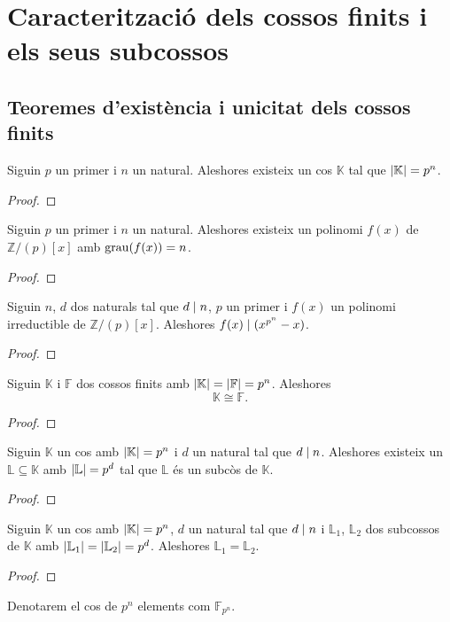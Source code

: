 \documentclass[../../Main.tex]{subfiles}
\begin{document}
\section{Caracterització dels cossos finits i els seus subcossos}
	\subsection{Teoremes d'existència i unicitat dels cossos finits}
	\begin{theorem}
		Siguin \(p\) un primer i \(n\) un natural. Aleshores existeix un cos \(\mathbb{K}\) tal que \(\abs{\mathbb{K}}=p^{n}\).
		\begin{proof}
		\end{proof}
	\end{theorem}
	\begin{corollary}
		Siguin \(p\) un primer i \(n\) un natural. Aleshores existeix un polinomi \(f(x)\) de \(\mathbb{Z}/(p)[x]\) amb \(\operatorname{grau}(f(x))=n\).
		\begin{proof}
		\end{proof}
	\end{corollary}
	\begin{lemma}
		Siguin \(n\), \(d\) dos naturals tal que \(d\mathrel{|} n\), \(p\) un primer i \(f(x)\) un polinomi irreductible de \(\mathbb{Z}/(p)[x]\). Aleshores \(f(x)\mathrel{|}(x^{p^{n}}-x)\).
		\begin{proof}
		\end{proof}
	\end{lemma}
	\begin{theorem}
		Siguin \(\mathbb{K}\) i \(\mathbb{F}\) dos cossos finits amb \(\abs{\mathbb{K}}=\abs{\mathbb{F}}=p^{n}\). Aleshores %
		\[\mathbb{K}\cong\mathbb{F}.\]
		\begin{proof}
		\end{proof}
	\end{theorem}
	\begin{theorem}
		Siguin \(\mathbb{K}\) un cos amb \(\abs{\mathbb{K}}=p^{n}\) i \(d\) un natural tal que \(d\mathrel{|} n\). Aleshores existeix un \(\mathbb{L}\subseteq\mathbb{K}\) amb \(\abs{\mathbb{L}}=p^{d}\) tal que \(\mathbb{L}\) és un subcòs de \(\mathbb{K}\).
		\begin{proof}
		\end{proof}
	\end{theorem}
	\begin{theorem}
		Siguin \(\mathbb{K}\) un cos amb \(\abs{\mathbb{K}}=p^{n}\), \(d\) un natural tal que \(d\mathrel{|} n\) i \(\mathbb{L}_{1}\), \(\mathbb{L}_{2}\) dos subcossos de \(\mathbb{K}\) amb \(\abs{\mathbb{L}_{1}}=\abs{\mathbb{L}_{2}}=p^{d}\). Aleshores \(\mathbb{L}_{1}=\mathbb{L}_{2}\).
		\begin{proof}
		\end{proof}
	\end{theorem}
	\begin{notation}
		Denotarem el cos de \(p^{n}\) elements com \(\mathbb{F}_{p^{n}}\).
	\end{notation}
\end{document}
